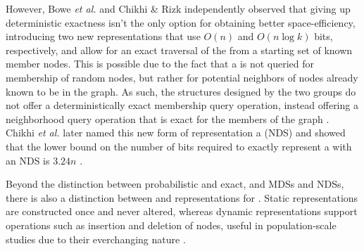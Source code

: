 However, Bowe \emph{et al.} \cite{Bowe2012} and Chikhi \& Rizk \cite{Chikhi2013} independently observed that giving up deterministic exactness isn't the only option for obtaining better space-efficiency, introducing two new representations that use $O(n)$ and $O(n \log k)$ bits, respectively, and allow for an exact traversal of the \dBG from a starting set of known member nodes. This is possible due to the fact that a \dBG is not queried for membership of random nodes, but rather for potential neighbors of nodes already known to be in the graph. As such, the structures designed by the two groups do not offer a deterministically exact membership query operation, instead offering a neighborhood query operation that is exact for the members of the graph \cite{Bowe2012, Chikhi2013}. Chikhi \emph{et al.} later named this new form of representation a  (NDS) and showed that the lower bound on the number of bits required to exactly represent a \dBG with an NDS is $3.24n$ \cite{Chikhi2014}.

Beyond the distinction between probabilistic and exact, and MDSs and NDSs, there is also a distinction between  and  representations for \dBG. Static representations are constructed once and never altered, whereas dynamic representations support operations such as insertion and deletion of nodes, useful in population-scale studies due to their everchanging nature \cite{Alipanahi2021}. 



